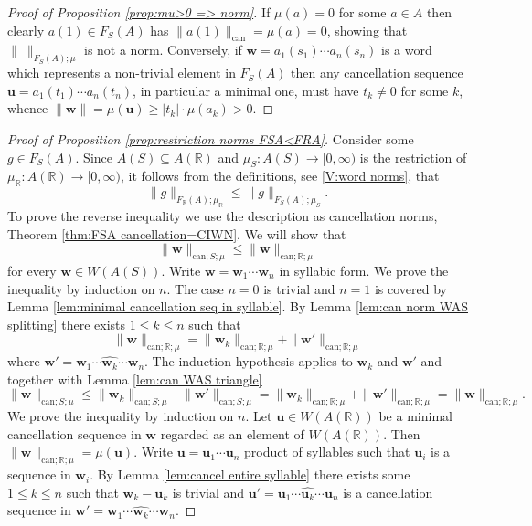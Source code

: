 \documentclass[12pt]{amsart}
\theoremstyle{definition}
\def\RR{\ensuremath{\mathbb{R}}}
\newcommand{\B}[1]{\mathbf{#1}}
\def\can{\text{can}}
\def\Free{F}
\begin{document}
\begin{proof}[Proof of Proposition \ref{prop:mu>0 => norm}]
If $\mu(a)=0$ for some $a \in A$ then clearly $a(1) \in \Free_S(A)$ has $\| a(1)\|_{\can} = \mu(a)=0$, showing that $\| \ \|_{\Free_S(A);\mu}$ is not a norm.
Conversely, if $\B w=a_1(s_1) \cdots a_n(s_n)$ is a word which represents a non-trivial element in $\Free_S(A)$ then any cancellation sequence $\B u=a_1(t_1) \cdots a_n(t_n)$, in particular a minimal one, must have $t_k \neq 0$ for some $k$, whence $\| \B w\| = \mu(\B u)\geq |t_k| \cdot \mu(a_k)>0$.
\end{proof}






\begin{proof}[Proof of Proposition \ref{prop:restriction norms FSA<FRA}]
Consider some $g \in \Free_S(A)$.
Since $A(S) \subseteq A(\RR)$ and $\mu_S \colon A(S) \to [0,\infty)$ is the restriction of $\mu_\RR \colon A(\RR) \to [0,\infty)$, it follows from the definitions, see \ref{V:word norms}, that 
\[
\|g \|_{\Free_\RR(A);\mu_\RR} \leq \| g\|_{\Free_S(A);\mu_S}.
\]
To prove the reverse inequality we use the description as cancellation norms, Theorem \ref{thm:FSA cancellation=CIWN}.
We will show that
\[
\| \B w\|_{\can;S;\mu} \leq \| \B w\|_{\can;\RR;\mu} 
\]
for every $\B w \in W(A(S))$.
Write $\B w = \B w_1 \cdots \B w_n$ in syllabic form.
We prove the inequality by induction on $n$.
The case $n=0$ is trivial and $n=1$ is covered by Lemma \ref{lem:minimal cancellation seq in syllable}.
By Lemma \ref{lem:can norm WAS splitting} there exists $1 \leq k \leq n$ such that
\[
\| \B w\|_{\can;\RR;\mu} =  \| \B w_k\|_{\can;\RR;\mu} + \| \B w'\|_{\can;\RR;\mu}
\]
where $\B w' = \B w_1 \cdots \widehat{\B w_k} \cdots \B w_n$.
The induction hypothesis applies to $\B w_k$ and $\B w'$ and together with Lemma  \ref{lem:can WAS triangle}
\[
\| \B w\|_{\can;S;\mu} \leq \| \B w_k\|_{\can;S;\mu} + \| \B w'\|_{\can;S;\mu}
=
\| \B w_k\|_{\can;\RR;\mu} + \| \B w'\|_{\can;\RR;\mu}
=
\| \B w\|_{\can;\RR;\mu}.
\]
\iffalse
We prove the inequality by induction on $n$.
Let $\B u \in W(A(\RR))$ be a minimal cancellation sequence in $\B w$ regarded as an element of $W(A(\RR))$.
Then $\| \B w\|_{\can;\RR;\mu}=\mu(\B u)$.
Write $\B u=\B u_1 \cdots \B u_n$ product of syllables such that $\B u_i$ is a sequence in $\B w_i$.
By Lemma \ref{lem:cancel entire syllable} there exists some $1 \leq k \leq n$ such that $\B w_k - \B u_k$ is trivial and $\B u' = \B u_1 \cdots \widehat{\B u_k} \cdots \B u_n$ is a cancellation sequence in $\B w'= \B w_1 \cdots \widehat{\B w_k} \cdots \B w_n$.

\end{proof}
\end{document}
